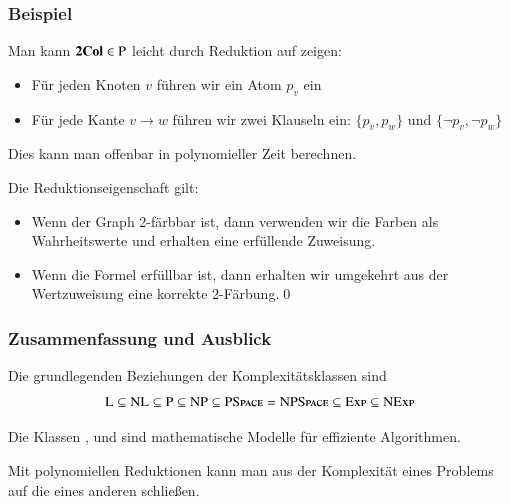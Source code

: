 \documentclass[aspectratio=1610,onlymath]{beamer}
\begin{document}
\begin{frame}\frametitle{Beispiel}



Man kann $\textbf{\textcolor{black}{2Col}}\in{\textsc{P}}$ leicht durch Reduktion auf  zeigen:
\begin{itemize}
\item Für jeden Knoten $v$ führen wir ein Atom $p_v$ ein
\item Für jede Kante $v\to w$ führen wir zwei Klauseln ein: $\{p_v,p_w\}$ und $\{\neg p_v,\neg p_w\}$\pause
\end{itemize}
Dies kann man offenbar in polynomieller Zeit berechnen.\bigskip\pause%

Die Reduktionseigenschaft gilt:
\begin{itemize}
\item Wenn der Graph 2-färbbar ist, dann verwenden wir die Farben als Wahrheitswerte und erhalten eine
	erfüllende Zuweisung.
\item Wenn die Formel erfüllbar ist, dann erhalten wir umgekehrt aus der Wertzuweisung eine korrekte 2-Färbung.\qed
\end{itemize}

\end{frame}


\begin{frame}\frametitle{Zusammenfassung und Ausblick}

Die grundlegenden Beziehungen der Komplexitätsklassen sind
\[{\textsc{L}}\subseteq{\textsc{NL}}\subseteq {\textsc{P}}\subseteq{\textsc{NP}}\subseteq{\textsc{PSpace}}= {\textsc{NPSpace}}\subseteq {\textsc{Exp}}\subseteq {\textsc{NExp}}\]

Die Klassen ,  und  sind mathematische Modelle für effiziente Algorithmen.\bigskip

Mit polynomiellen Reduktionen kann man aus der Komplexität eines Problems auf die eines anderen schließen.\bigskip


\end{frame}
\end{document}
